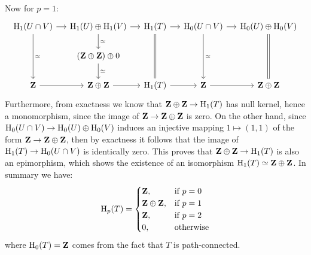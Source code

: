 \begin{example}[Torus]
\begin{enumerate}[(a)]
              Now for \(p = 1\):
              \[
                  \begin{tikzcd}[column sep=small]
                      \Hmlg_1(U \cap V)
                      \ar[r] \ar[dd, "\dis"]
                      &\Hmlg_1(U) \oplus \Hmlg_1(V)
                      \ar[r] \ar[d, "\dis"]
                      &\Hmlg_1(T) \ar[r]
                      \ar[dd, equals]
                      &\Hmlg_0(U \cap V)
                      \ar[dd, "\dis"]
                      \ar[r]
                      &\Hmlg_0(U) \oplus \Hmlg_0(V)
                      \ar[dd, equals]
                      \\
                      &(\Z \oplus \Z) \oplus 0
                      \ar[d, "\dis"]
                      &&&
                      \\
                      \Z
                      \ar[r]
                      &\Z \oplus \Z
                      \ar[r]
                      &\Hmlg_1(T)
                      \ar[r]
                      &\Z \ar[r]
                      &\Z \oplus \Z
                  \end{tikzcd}
              \]
              Furthermore, from exactness we know that \(\mathbf{Z} \oplus \mathbf{Z} \to \operatorname{H}_1(T)\) has null
              kernel, hence a monomorphism, since the image of \(\mathbf{Z} \to \mathbf{Z} \oplus \mathbf{Z}\) is zero. On
              the other hand, since \(\operatorname{H}_0(U \cap V) \to \operatorname{H}_0(U) \oplus \operatorname{H}_0(V)\) induces an
              injective mapping \(1 \mapsto (1, 1)\) of the form \(\mathbf{Z} \to \mathbf{Z} \oplus \mathbf{Z}\), then by
              exactness it follows that the image of \(\operatorname{H}_1(T) \to \operatorname{H}_0(U \cap V)\) is
              identically zero. This proves that \(\mathbf{Z} \oplus \mathbf{Z} \to \operatorname{H}_1(T)\) is also an
              epimorphism, which shows the existence of an isomorphism
              \(\operatorname{H}_1(T) \simeq \mathbf{Z} \oplus \mathbf{Z}\). In summary we have:
              \[
                  \operatorname{H}_p(T) =
                  \begin{cases}
                      \mathbf{Z},           & \text{if } p = 0 \\
                      \mathbf{Z} \oplus \mathbf{Z}, & \text{if } p = 1 \\
                      \mathbf{Z},           & \text{if } p = 2 \\
                      0,            & \text{otherwise}
                  \end{cases}
              \]
              where \(\operatorname{H}_0(T) = \mathbf{Z}\) comes from the fact that \(T\) is path-connected.
    \end{enumerate}
\end{example}

